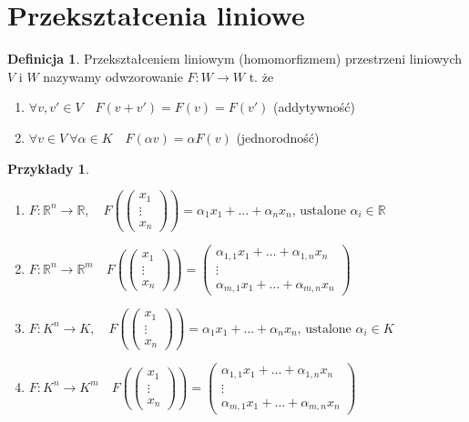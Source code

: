 \documentclass[12pt,a4paper]{article}
\newcommand{\RR}{\mathbb{R}}
\theoremstyle{plain}
\theoremstyle{definition}
\theoremstyle{definition}
\newtheorem{df}{Definicja}[section]
\theoremstyle{definition}
\theoremstyle{definition}
\theoremstyle{definition}
\theoremstyle{definition}
\theoremstyle{definition}
\newtheorem*{przy}{Przykłady}
\theoremstyle{definition}
\theoremstyle{definition}
\begin{document}
\section{Przekształcenia liniowe} 
\begin{df}
    Przekształceniem liniowym (homomorfizmem) przestrzeni liniowych $V \text{ i } W$ nazywamy odwzorowanie $F: W \rightarrow W$ t. że
    \begin{enumerate}[{(}1{)}]
        \item $\forall v, v' \in V \quad F(v+v') = F(v) = F(v')$ (addytywność) 
        \item $\forall v \in V \ \forall \alpha \in K \quad F(\alpha v) = \alpha F(v)$ (jednorodność)
    \end{enumerate}
\end{df}

\begin{przy}
    \hfill
    \begin{enumerate}[{(}1{)}]
        \item $F: \RR^n \rightarrow \RR, \quad F \left( \begin{pmatrix} x_1 \\ \vdots \\ x_n \end{pmatrix}\right) = \alpha_1 x_1 + \dots + \alpha_n x_n \text{, ustalone } \alpha_i \in \RR$ 
        \item $F: \RR^n \rightarrow \RR^m  \quad F \left( \begin{pmatrix} x_1 \\ \vdots \\ x_n \end{pmatrix}\right) = \begin{pmatrix} \alpha_{1,1}x_1 + \dots + \alpha_{1,n} x_n\\ \vdots \\ \alpha_{m,1}x_1 + \dots + \alpha_{m,n} x_n \end{pmatrix}$
        \item $F: K^n \rightarrow K, \quad F \left( \begin{pmatrix} x_1 \\ \vdots \\ x_n \end{pmatrix}\right) = \alpha_1 x_1 + \dots + \alpha_n x_n \text{, ustalone } \alpha_i \in K$ 
        \item $F: K^n \rightarrow K^m  \quad F \left( \begin{pmatrix} x_1 \\ \vdots \\ x_n \end{pmatrix}\right) = \begin{pmatrix} \alpha_{1,1}x_1 + \dots + \alpha_{1,n} x_n\\ \vdots \\ \alpha_{m,1}x_1 + \dots + \alpha_{m,n} x_n \end{pmatrix}$

\end{enumerate}
\end{przy}
\end{document}
